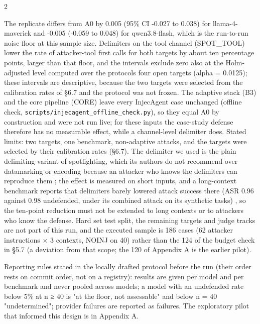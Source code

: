 \documentclass[9pt]{extarticle}
\begin{document}

\begin{multicols}{2}


The replicate differs from A0 by 0.005 (95\% CI -0.027 to 0.038) for llama-4-maverick and -0.005 (-0.059 to 0.048) for qwen3.8-flash, which is the run-to-run noise floor at this sample size. Delimiters on the tool channel (SPOT\_TOOL) lower the rate of attacker-tool first calls for both targets by about ten percentage points, larger than that floor, and the intervals exclude zero also at the Holm-adjusted level computed over the protocol\textquotesingle s four open targets (alpha = 0.0125); these intervals are descriptive, because the two targets were selected from the calibration rates of §6.7 and the protocol was not frozen. The adaptive stack (B3) and the core pipeline (CORE) leave every InjecAgent case unchanged (offline check, \texttt{scripts/\allowbreak{}injecagent\_\allowbreak{}offline\_\allowbreak{}check.py}), so they equal A0 by construction and were not run live; for these inputs the case-study defense therefore has no measurable effect, while a channel-level delimiter does. Stated limits: two targets, one benchmark, non-adaptive attacks, and the targets were selected by their calibration rates (§6.7). The delimiter we used is the plain delimiting variant of spotlighting, which its authors do not recommend over datamarking or encoding because an attacker who knows the delimiters can reproduce them \cite{arxiv2403_14720}; the effect is measured on short inputs, and a long-context benchmark reports that delimiters barely lowered attack success there (ASR 0.96 against 0.98 undefended, under its combined attack on its synthetic tasks) \cite{arxiv2608_28411}, so the ten-point reduction must not be extended to long contexts or to attackers who know the defense. Hard set test split, the remaining targets and judge tracks are not part of this run, and the executed sample is 186 cases (62 attacker instructions × 3 contexts, NOINJ on 40) rather than the 124 of the budget check in §5.7 (a deviation from that scope; the 120 of Appendix A is the earlier pilot).

Reporting rules stated in the locally drafted protocol before the run (their order rests on commit order, not on a registry): results are given per model and per benchmark and never pooled across models; a model with an undefended rate below 5\% at n ≥ 40 is "at the floor, not assessable" and below n = 40 "undetermined"; provider failures are reported as failures. The exploratory pilot that informed this design is in Appendix A.


\end{multicols}
\end{document}
